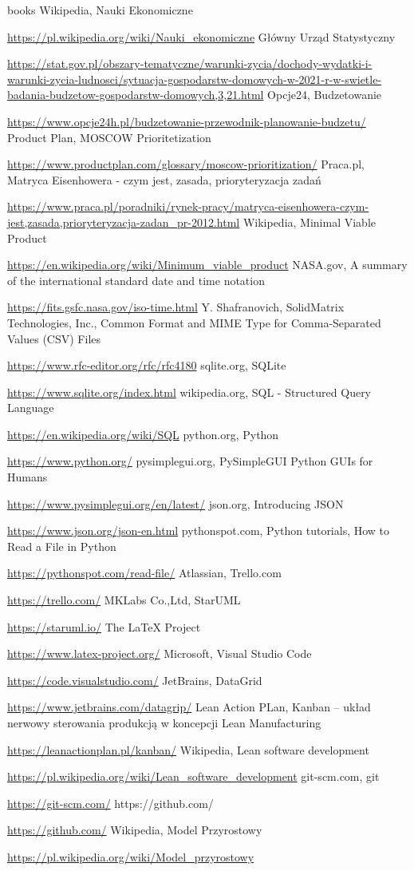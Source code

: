 \documentclass[a4paper,10pt, twoside]{report}
\begin{document}
\begin{thebibliography} {books}
 Wikipedia, Nauki Ekonomiczne \raggedright\url{
    https://pl.wikipedia.org/wiki/Nauki_ekonomiczne}
 Główny Urząd Statystyczny \raggedright\url{
    https://stat.gov.pl/obszary-tematyczne/warunki-zycia/dochody-wydatki-i-warunki-zycia-ludnosci/sytuacja-gospodarstw-domowych-w-2021-r-w-swietle-badania-budzetow-gospodarstw-domowych,3,21.html}
 Opcje24, Budzetowanie \raggedright\url{
    https://www.opcje24h.pl/budzetowanie-przewodnik-planowanie-budzetu/}
 Product Plan, MOSCOW Prioritetization \raggedright\url{
    https://www.productplan.com/glossary/moscow-prioritization/}
Praca.pl, Matryca Eisenhowera - czym jest, zasada, prioryteryzacja zadań \raggedright\url{
    https://www.praca.pl/poradniki/rynek-pracy/matryca-eisenhowera-czym-jest,zasada,prioryteryzacja-zadan_pr-2012.html}
 Wikipedia, Minimal Viable Product \raggedright\url{
    https://en.wikipedia.org/wiki/Minimum_viable_product}
 NASA.gov, A summary of the international standard date and time notation \raggedright\url{
    https://fits.gsfc.nasa.gov/iso-time.html}
 Y. Shafranovich, SolidMatrix Technologies, Inc., Common Format and MIME Type for Comma-Separated Values (CSV) Files \raggedright\url{
    https://www.rfc-editor.org/rfc/rfc4180}
 sqlite.org, SQLite \raggedright\url{
    https://www.sqlite.org/index.html}
 wikipedia.org, SQL - Structured Query Language \raggedright\url{
    https://en.wikipedia.org/wiki/SQL}
 python.org, Python \raggedright\url{
    https://www.python.org/}
 pysimplegui.org, PySimpleGUI Python GUIs for Humans \raggedright\url{
    https://www.pysimplegui.org/en/latest/}
 json.org, Introducing JSON \raggedright\url{
    https://www.json.org/json-en.html}
 pythonspot.com, Python tutorials, How to Read a File in Python \raggedright\url{
    https://pythonspot.com/read-file/}
 Atlassian, Trello.com \raggedright\url{
    https://trello.com/}
 MKLabs Co.,Ltd, StarUML \raggedright\url{
    https://staruml.io/}
 The LaTeX Project \raggedright\url{
    https://www.latex-project.org/}
 Microsoft, Visual Studio Code \raggedright\url{
    https://code.visualstudio.com/}
 JetBrains, DataGrid \raggedright\url{
    https://www.jetbrains.com/datagrip/}
 Lean Action PLan, Kanban – układ nerwowy sterowania produkcją w koncepcji Lean Manufacturing \raggedright\url{
    https://leanactionplan.pl/kanban/}
 Wikipedia, Lean software development \raggedright\url{
    https://pl.wikipedia.org/wiki/Lean_software_development}
 git-scm.com, git \raggedright\url{
    https://git-scm.com/}
 https://github.com/ \raggedright\url{
    https://github.com/}
 Wikipedia, Model Przyrostowy \raggedright\url{
    https://pl.wikipedia.org/wiki/Model_przyrostowy}

\end{thebibliography}





\listoffigures
\listoftables
\lstlistoflistings
\end{document}
